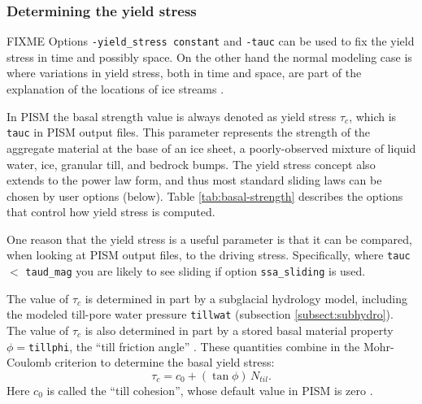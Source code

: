 \subsubsection*{Determining the yield stress}  FIXME  Options \texttt{-yield_stress constant} and \texttt{-tauc} can be used to fix the yield stress in time and possibly space.  On the other hand the normal modeling case is where variations in yield stress, both in time and space, are part of the explanation of the locations of ice streams \cite{SchoofStream}.

In PISM the basal strength value is always denoted as yield stress $\tau_c$, which is \texttt{tauc} in PISM output files.  This parameter represents the strength of the aggregate material at the base of an ice sheet, a poorly-observed mixture of liquid water, ice, granular till, and bedrock bumps.  The yield stress concept also extends to the power law form, and thus most standard sliding laws can be chosen by user options (below).  Table \ref{tab:basal-strength} describes the options that control how yield stress is computed.

One reason that the yield stress is a useful parameter is that it can be compared, when looking at PISM output files, to the driving stress.  Specifically, where \texttt{tauc} $<$ \texttt{taud_mag} you are likely to see sliding if option \texttt{ssa_sliding} is used.

The value of $\tau_c$ is determined in part by a subglacial hydrology model, including the modeled till-pore water pressure \texttt{tillwat} (subsection \ref{subsect:subhydro}).  The value of $\tau_c$ is also determined in part by a stored basal material property $\phi=$\texttt{tillphi}, the ``till friction angle'' \cite{Paterson}.  These quantities combine in the Mohr-Coulomb criterion \cite[Chapter 8]{Paterson} to determine the basal yield stress:
\begin{equation}
   \tau_c = c_{0} + (\tan\phi)\,N_{til}.  \label{eq:mohrcoulomb}
\end{equation}
Here $c_0$ is called the ``till cohesion'', whose default value in PISM is zero \cite[formula (2.4)]{SchoofStream}.

